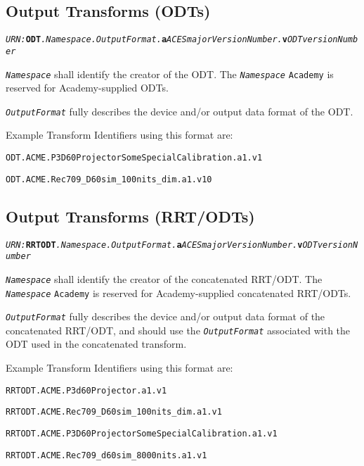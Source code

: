 \subsection{Output Transforms (ODTs)}

\texttt{\textit{URN:}\textbf{ODT}\textit{.Namespace.OutputFormat.}\textbf{a}\textit{ACESmajorVersionNumber.}\textbf{v}\textit{ODTversionNumber}}

\texttt{\textit{Namespace}} shall identify the creator of the ODT. The \texttt{\textit{Namespace}} \texttt{Academy} is reserved for Academy-supplied ODTs. 

\texttt{\textit{OutputFormat}} fully describes the device and/or output data format of the ODT.

Example Transform Identifiers using this format are:
\begin{listize}
	\item {\small \texttt{\urn{}ODT.ACME.P3D60\+Projector\+Some\+Special\+Cali\+bration.\+a1.v1}}
	\item {\small \texttt{\urn{}ODT.ACME.Rec709\_D60sim\_100nits\_\+dim.a1.v10}}
\end{listize}

\subsection{Output Transforms (RRT/ODTs)} \label{sec:rrtodt}

\texttt{\textit{URN:}\textbf{RRTODT}\textit{.Namespace.OutputFormat.}\textbf{a}\textit{ACESmajorVersionNumber.}\textbf{v}\textit{ODTversionNumber}}

\texttt{\textit{Namespace}} shall identify the creator of the concatenated RRT/ODT. The \texttt{\textit{Namespace}} \texttt{Academy} is reserved for Academy-supplied concatenated RRT/ODTs.

\texttt{\textit{OutputFormat}} fully describes the device and/or output data format of the concatenated RRT/ODT, and should use the \texttt{\textit{OutputFormat}} associated with the ODT used in the concatenated transform. 


Example Transform Identifiers using this format are: 
\begin{listize}
	\item {\small \texttt{\urn{}RRTODT.ACME.P3d60Projector.a1.v1}}
	\item {\small \texttt{\urn{}RRTODT.ACME.Rec709\_D60sim\_100nits\_dim.\+a1.\+v1}}
	\item {\small \texttt{\urn{}RRTODT.ACME.P3D60\+Projector\+Some\+Special\+Calibration.\+a1.v1}}
	\item {\small \texttt{\urn{}RRTODT.ACME.Rec709\_d60sim\_8000nits.a1.v1}}
\end{listize}

